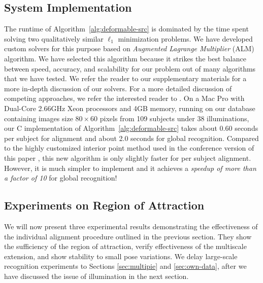 \documentclass[10pt,journal,letterpaper,compsoc]{IEEEtran}
\begin{document}
\subsection{System Implementation}
The runtime of Algorithm~\ref{alg:deformable-src} is dominated
by the time spent solving two qualitatively similar $\ell_1$ minimization problems.
We have developed custom solvers for this purpose based on
\emph{Augmented Lagrange Multiplier} (ALM) algorithm.
We have selected this algorithm because it strikes the best
balance between speed, accuracy, and scalability for our problem out of
many algorithms that we have tested. We refer the reader to our
supplementary materials for a more in-depth discussion of our
solvers.
For a more detailed discussion of competing
approaches, we refer the interested reader to
\cite{YangA2010-pp}.
On a Mac Pro with
Dual-Core 2.66GHz Xeon processors and 4GB memory,
running on our database containing images size $80\times 60$
pixels from 109 subjects under 38 illuminations,
our C implementation of Algorithm~\ref{alg:deformable-src} takes
about 0.60 seconds per subject for alignment and about 2.0
seconds for global recognition. Compared to the highly
customized interior point method used in the conference version
of this paper \cite{Wagner2009-CVPR}, this new algorithm is
only slightly faster for per subject alignment. However, it is
much simpler to implement and it achieves a
\emph{speedup of more than a factor of 10} for global
recognition!

\subsection{Experiments on Region of Attraction} We will now present three
experimental results demonstrating the effectiveness of the individual
alignment procedure outlined in the previous section. They show the sufficiency
of the region of attraction, verify effectiveness of the multiscale extension,
and show stability to small pose variations.  We delay large-scale recognition
experiments to Sections \ref{sec:multipie} and \ref{sec:own-data}, after we
have discussed the issue of illumination in the next section.
\end{document}
